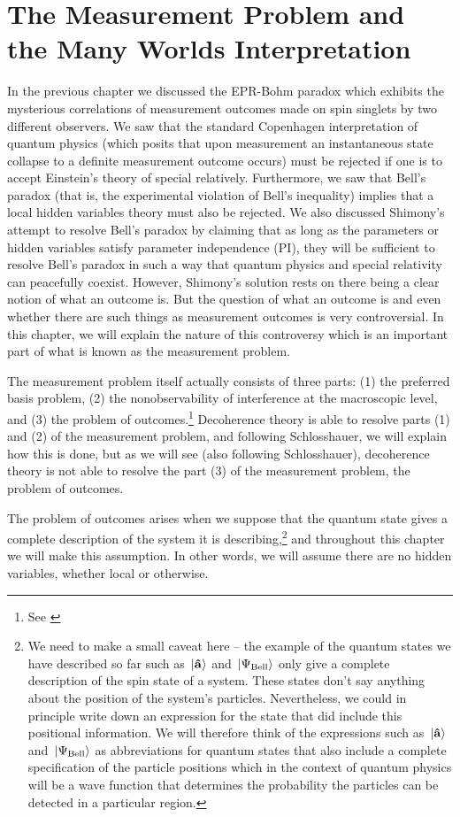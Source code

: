 \chapter{The Measurement Problem and the Many Worlds Interpretation\label{measprobchap}}
In the previous chapter we discussed the EPR-Bohm paradox which exhibits the mysterious correlations of measurement outcomes made on spin singlets by two different observers. We saw that the standard Copenhagen interpretation of quantum physics (which posits that upon measurement  an instantaneous state collapse to a definite measurement outcome occurs) must be rejected if one is to accept Einstein's theory of special relatively. Furthermore, we saw that Bell's paradox (that is, the experimental violation of Bell's inequality) implies that a local hidden variables theory must also be rejected. We also discussed Shimony's attempt to resolve Bell's paradox by claiming that as long as the parameters or hidden variables satisfy parameter independence (PI), they will be sufficient to resolve Bell's paradox in such a way that quantum physics and special relativity can peacefully coexist. However, Shimony's solution rests on there being a clear notion of what an outcome is. But the question of what an outcome is and even whether there are such things as measurement outcomes is very controversial. In this chapter, we will explain the nature of this controversy which is an important part of what is known as the measurement problem. 

The measurement problem itself actually consists of three parts: (1) the preferred basis problem, (2) the nonobservability of interference at the macroscopic level, and (3) the problem of outcomes.\footnote{See \cite[50]{Schlosshauer}} 
Decoherence theory is able to resolve parts (1) and (2) of the measurement problem, and following Schlosshauer, we will explain how this is done, but as we will see (also following Schlosshauer), decoherence theory is not able to resolve the part (3) of the measurement problem, the problem of outcomes.

The problem of outcomes arises when we suppose that the quantum state gives a complete description of the system it is describing,\footnote{We need to make a small caveat here -- the example of the quantum states we have described so far such as $\ket*{\vb{\hat{{a}}}}$ and $\ket*{\Psi_{\text{Bell}}}$ only give a complete description of the spin state of a system. These states don't say anything about the position of the system's particles. Nevertheless, we could in principle write down an expression for the state that did include this positional information. We will therefore think of the expressions such as $\ket*{\vb{\hat{{a}}}}$ and $\ket*{\Psi_{\text{Bell}}}$ as abbreviations for quantum states that also include a complete specification of the particle positions which in the context of quantum physics will be a wave function that determines the probability the particles can be detected in a particular region.} and throughout this chapter we will make this assumption. In other words, we will assume there are no hidden variables, whether local or otherwise. 

